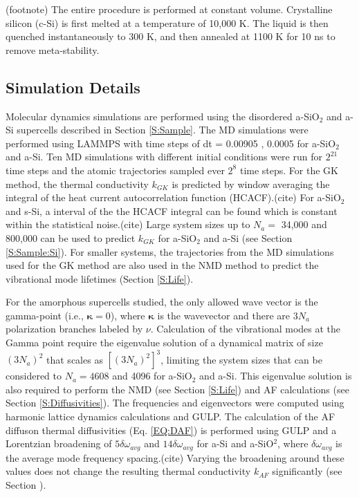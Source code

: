 \documentclass[aps,prb,onecolumn,preprint,superscriptaddress,footinbib,amsmath,amssymb,floatfix]{revtex4}
\begin{document}
(footnote)
The entire procedure is performed at constant volume. Crystalline 
silicon (c-Si) is first 
melted at a temperature of 10,000 K. The liquid is then quenched 
instantaneously to 300 K, and then annealed at 1100 K for 10 ns to remove 
meta-stability. 

\subsection{\label{S:Simulation}Simulation Details}

Molecular dynamics simulations are performed using the disordered 
a-SiO$_2$ and a-Si supercells described in 
Section \ref{S:Sample}. 
The MD simulations were performed using LAMMPS\cite{plimpton_fast_1995}  
with time steps of dt = 0.00905 , 0.0005 for a-SiO$_2$ and a-Si. 
Ten MD simulations with different initial conditions were run 
for $2^21$ time steps and the atomic trajectories sampled 
ever $2^8$ time steps. For the GK method, the thermal conductivity 
$k_{GK}$ is 
predicted by window averaging the integral of the heat current 
autocorrelation function (HCACF).(cite) For a-SiO$_2$ and s-Si, a interval 
of the the HCACF integral can be found which is constant within the 
statistical noise.(cite) Large system sizes up to $N_a = $ 34,000 and 
800,000 can be used to predict $k_{GK}$ for a-SiO$_2$ and a-Si 
(see Section \ref{S:Sample:Si}). For smaller 
systems, the trajectories from the MD simulations used for the GK method 
are also used in the NMD method to predict the vibrational mode 
lifetimes (Section \ref{S:Life}). 

For the amorphous supercells studied,
the only allowed wave vector is the gamma-point (i.e., $\pmb{\kappa}=0$),  
where $\pmb{\kappa}$ is the wavevector and there are $3N_a$ polarization 
branches labeled by $\nu$. 
Calculation of the 
vibrational modes at the Gamma point require the eigenvalue solution 
of a dynamical matrix of size 
$(3N_a)^2$ that scales as $[(3N_a)^2]^3$, limiting the system 
sizes that can be considered to $N_a = 4608$ and 4096 for a-SiO$_2$ and a-Si. 
This eigenvalue solution is also required to perform the NMD 
(see Section \ref{S:Life})  
and AF calculations (see Section \ref{S:Diffusivities}). 
The frequencies and eigenvectors were computed using harmonic
lattice dynamics calculations and GULP.\cite{gale_general_2003} 
The calculation of the AF diffuson thermal diffusivities 
(Eq. \eqref{EQ:DAF}) 
is performed using GULP and a Lorentzian 
broadening of $5\delta\omega_{avg}$ and $14\delta\omega_{avg}$ for 
a-Si and a-SiO$^2$, where $\delta\omega_{avg}$ is the average mode 
frequency spacing.(cite) Varying the broadening around these values does not 
change the resulting thermal conductivity $k_{AF}$ significantly 
(see Section ). 
\end{document}
